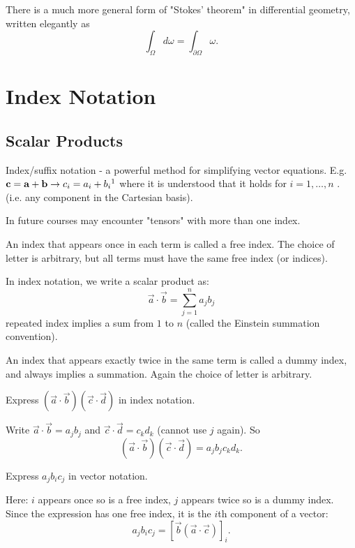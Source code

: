 \documentclass[10pt, a4paper]{article}
\begin{document}
\begin{remark}
    There is a much more general form of
    "Stokes' theorem"
    in differential geometry,
    written elegantly as
    \[
    \int_{\Omega}d\omega = \int_{\partial\Omega}\omega.
    \]
\end{remark}

\newpage

\section{Index Notation}

\subsection{Scalar Products}

Index/suffix notation -
a powerful method for simplifying vector equations.
E.g. $\vec{c} = \vec{a} + \vec{b} \to c_i = a_i + b_i\footnotemark$ where it is understood that it holds for $i = 1, \dotsc, n$
.
(i.e.
any component in the Cartesian basis).

\begin{remark}
    In future courses may encounter "tensors" with more than one index.
\end{remark}

An index that appears once in each term is called a free index.
The choice of letter is arbitrary,
but all terms must have the same free index
(or indices).

In index notation,
we write a scalar product as:
\[
\vec{a} \cdot \vec{b} = \sum_{j = 1}^{n}a_jb_j
\]
repeated index implies a sum from $1$ to $n$
(called the Einstein summation convention).

An index that appears exactly twice in the same term is called a dummy index,
and always implies a summation.
Again the choice of letter is arbitrary.

\begin{example}
    Express $(\vec{a} \cdot \vec{b})(\vec{c} \cdot \vec{d})$ in index notation.

    Write $\vec{a} \cdot \vec{b} = a_jb_j$ and $\vec{c} \cdot \vec{d} = c_kd_k$
    (cannot use $j$ again).
    So
    \[
    (\vec{a}\cdot\vec{b})(\vec{c}\cdot\vec{d}) = a_jb_jc_kd_k.
    \]
\end{example}

\begin{example}
    Express $a_jb_ic_j$ in vector notation.

    Here:
    $i$ appears once so is a free index,
    $j$ appears twice so is a dummy index.
    Since the expression has one free index,
    it is the $i$th component of a vector:
    \[
    a_jb_ic_j = [\vec{b}(\vec{a} \cdot \vec{c})]_i.
    \]
\end{example}
\end{document}
